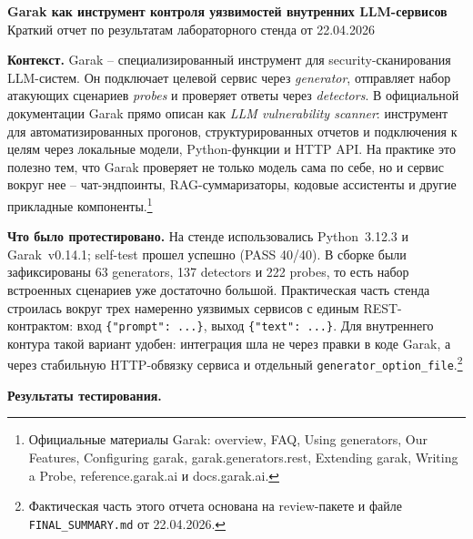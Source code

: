 \documentclass[11pt,a4paper]{article}
\begin{document}
\begin{center}
{\Large\bfseries Garak как инструмент контроля уязвимостей внутренних LLM-сервисов}\\[0.25em]
{\normalsize Краткий отчет по результатам лабораторного стенда от 22.04.2026}
\end{center}

\textbf{Контекст.} Garak -- специализированный инструмент для security-сканирования LLM-систем. Он подключает целевой сервис через \emph{generator}, отправляет набор атакующих сценариев \emph{probes} и проверяет ответы через \emph{detectors}. В официальной документации Garak прямо описан как \emph{LLM vulnerability scanner}: инструмент для автоматизированных прогонов, структурированных отчетов и подключения к целям через локальные модели, Python-функции и HTTP API. На практике это полезно тем, что Garak проверяет не только модель сама по себе, но и сервис вокруг нее -- чат-эндпоинты, RAG-суммаризаторы, кодовые ассистенты и другие прикладные компоненты.\footnote{Официальные материалы Garak: overview, FAQ, Using generators, Our Features, Configuring garak, garak.generators.rest, Extending garak, Writing a Probe, reference.garak.ai и docs.garak.ai.}

\textbf{Что было протестировано.} На стенде использовались Python~3.12.3 и Garak~v0.14.1; self-test прошел успешно (PASS 40/40). В сборке были зафиксированы 63 generators, 137 detectors и 222 probes, то есть набор встроенных сценариев уже достаточно большой. Практическая часть стенда строилась вокруг трех намеренно уязвимых сервисов с единым REST-контрактом: вход \verb|{"prompt": ...}|, выход \verb|{"text": ...}|. Для внутреннего контура такой вариант удобен: интеграция шла не через правки в коде Garak, а через стабильную HTTP-обвязку сервиса и отдельный \verb|generator_option_file|.\footnote{Фактическая часть этого отчета основана на review-пакете и файле \texttt{FINAL\_SUMMARY.md} от 22.04.2026.}

\textbf{Результаты тестирования.}
\end{document}

